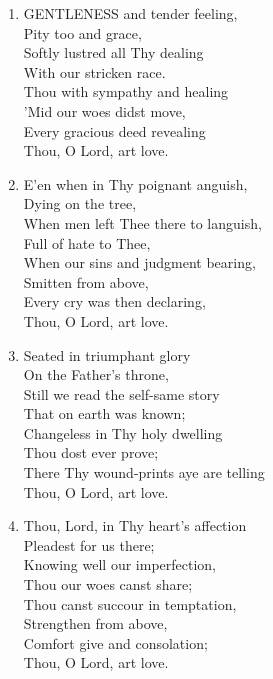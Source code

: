 \begin{enumerate}
    \item GENTLENESS and tender feeling, \\
            Pity too and grace, \\
        Softly lustred all Thy dealing \\
            With our stricken race. \\
        Thou with sympathy and healing \\
            'Mid our woes didst move, \\
        Every gracious deed revealing \\
            Thou, O Lord, art love.

    \item E'en when in Thy poignant anguish, \\
            Dying on the tree, \\
        When men left Thee there to languish, \\
            Full of hate to Thee, \\
        When our sins and judgment bearing, \\
            Smitten from above, \\
        Every cry was then declaring, \\
            Thou, O Lord, art love.

    \item Seated in triumphant glory \\
            On the Father's throne, \\
        Still we read the self-same story \\
            That on earth was known; \\
        Changeless in Thy holy dwelling \\
            Thou dost ever prove; \\
        There Thy wound-prints aye are telling \\
            Thou, O Lord, art love.

    \item Thou, Lord, in Thy heart's affection \\
            Pleadest for us there; \\
        Knowing well our imperfection, \\
            Thou our woes canst share; \\
        Thou canst succour in temptation, \\
            Strengthen from above, \\
        Comfort give and consolation; \\
            Thou, O Lord, art love.


\end{enumerate}
